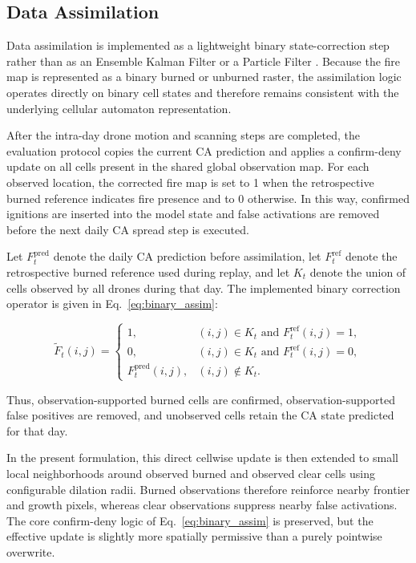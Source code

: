 \documentclass[10pt,letterpaper]{article}
\begin{document}
\subsection*{Data Assimilation}

Data assimilation is implemented as a lightweight binary
state-correction step rather than as an Ensemble Kalman Filter or a
Particle Filter \cite{evensen2003,doucet2001}. Because the fire map is
represented as a binary burned or unburned raster, the assimilation
logic operates directly on binary cell states and therefore remains
consistent with the underlying cellular automaton representation.

After the intra-day drone motion and scanning steps are completed, the
evaluation protocol copies the current CA prediction and applies a confirm-deny
update on all cells present in the shared global observation map. For each
observed location, the corrected fire map is set to 1 when the
retrospective burned reference indicates fire presence and to 0
otherwise. In this way, confirmed ignitions are inserted into the model
state and false activations are removed before the next daily CA spread
step is executed.

Let $F_t^{\mathrm{pred}}$ denote the daily CA prediction before
assimilation, let $F_t^{\mathrm{ref}}$ denote the retrospective burned
reference used during replay, and let $K_t$ denote the union of cells
observed by all drones during that day. The implemented binary
correction operator is given in Eq.~\ref{eq:binary_assim}:

\begin{equation}
\widetilde{F}_t(i,j)=
\begin{cases}
1, & (i,j)\in K_t \text{ and } F_t^{\mathrm{ref}}(i,j)=1, \\
0, & (i,j)\in K_t \text{ and } F_t^{\mathrm{ref}}(i,j)=0, \\
F_t^{\mathrm{pred}}(i,j), & (i,j)\notin K_t.
\end{cases}
\label{eq:binary_assim}
\end{equation}

Thus, observation-supported burned cells are confirmed, observation-supported
false positives are removed, and unobserved cells retain the CA state
predicted for that day.

In the present formulation, this direct cellwise update
is then extended to small local neighborhoods around observed burned and
observed clear cells using configurable dilation radii. Burned
observations therefore reinforce nearby frontier and growth pixels,
whereas clear observations suppress nearby false activations. The core
confirm-deny logic of Eq.~\ref{eq:binary_assim} is preserved, but the
effective update is slightly more spatially permissive than a purely
pointwise overwrite.
\end{document}
